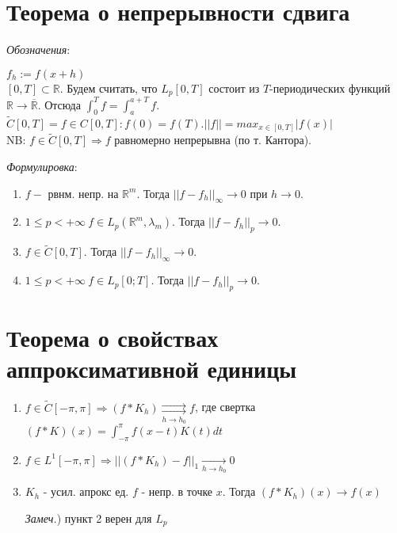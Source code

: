 \documentclass[paper=a4, fontsize=14pt]{article}
\begin{document}
\section{Теорема о непрерывности сдвига}
\emph{Обозначения}:

$f_h := f(x+h)$ \\
$[0, T] \subset \mathbb{R}$. Будем считать, что $L_p[0, T]$ состоит из $T$-периодических функций $\mathbb{R} \rightarrow \overline {\mathbb{R}}$. Отсюда $\int_{0}^{T} f = \int_{a}^{a+T} f.$ \\
$\widetilde{C}[0, T] = {f \in C[0, T]: f(0) = f(T) }. ||f|| = max_{x\in[0,T]}|f(x)|$ \\
NB: $f \in \widetilde{C}[0, T] \Rightarrow f$ равномерно непрерывна (по т. Кантора).

\emph{Формулировка}:
\begin{enumerate}
\item $f - $ рвнм. непр. на $\mathbb{R}^m$. Тогда $||f-f_h||_\infty \rightarrow 0$ при $h\rightarrow 0$.
\item $1 \leq p < + \infty \ f \in L_p(\mathbb{R}^m, \lambda_m)$. Тогда $||f-f_h||_p \rightarrow 0$.
\item $f \in \widetilde{C}[0, T]$. Тогда $||f-f_h||_\infty \rightarrow 0$.
\item $1 \leq p < + \infty \  f \in L_p[0; T]$. Тогда $||f-f_h||_p \rightarrow 0$.
\end{enumerate}

\section{Теорема о свойствах аппроксимативной единицы}
\begin{enumerate}
\item $f \in \widetilde{C}[-\pi, \pi] \Rightarrow (f * K_h) \underset{h \rightarrow h_0}{\rightrightarrows} f $, где
свертка $(f* K)(x) = \int_{-\pi}^{\pi} f(x-t)K(t)dt$

\item $f \in L^1 [-\pi, \pi] \Rightarrow ||(f * K_h) - f||_1 \underset{h \rightarrow h_0}{\rightarrow} 0 $
\item $K_h$ - усил. апрокс ед. $f$ - непр. в точке $x$. Тогда $(f * K_h)(x) \rightarrow f(x)$

\emph{Замеч.}) пункт 2 верен для $ L_p $
\end{enumerate}
\end{document}
